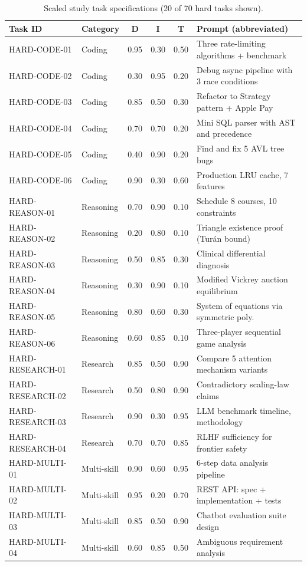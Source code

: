 \begin{table}[h]
\centering
\caption{Scaled study task specifications (20 of 70 hard tasks shown).}
\label{tab:scaled_tasks}
\scriptsize
\begin{tabular}{llcccl}
\toprule
\textbf{Task ID} & \textbf{Category} & \textbf{D} & \textbf{I} & \textbf{T} & \textbf{Prompt (abbreviated)} \\
\midrule
HARD-CODE-01 & Coding & 0.95 & 0.30 & 0.50 & Three rate-limiting algorithms + benchmark \\
HARD-CODE-02 & Coding & 0.30 & 0.95 & 0.20 & Debug async pipeline with 3 race conditions \\
HARD-CODE-03 & Coding & 0.85 & 0.50 & 0.30 & Refactor to Strategy pattern + Apple Pay \\
HARD-CODE-04 & Coding & 0.70 & 0.70 & 0.20 & Mini SQL parser with AST and precedence \\
HARD-CODE-05 & Coding & 0.40 & 0.90 & 0.20 & Find and fix 5 AVL tree bugs \\
HARD-CODE-06 & Coding & 0.90 & 0.30 & 0.60 & Production LRU cache, 7 features \\
HARD-REASON-01 & Reasoning & 0.70 & 0.90 & 0.10 & Schedule 8 courses, 10 constraints \\
HARD-REASON-02 & Reasoning & 0.20 & 0.80 & 0.10 & Triangle existence proof (Tur\'{a}n bound) \\
HARD-REASON-03 & Reasoning & 0.50 & 0.85 & 0.30 & Clinical differential diagnosis \\
HARD-REASON-04 & Reasoning & 0.30 & 0.90 & 0.10 & Modified Vickrey auction equilibrium \\
HARD-REASON-05 & Reasoning & 0.80 & 0.60 & 0.30 & System of equations via symmetric poly. \\
HARD-REASON-06 & Reasoning & 0.60 & 0.85 & 0.10 & Three-player sequential game analysis \\
HARD-RESEARCH-01 & Research & 0.85 & 0.50 & 0.90 & Compare 5 attention mechanism variants \\
HARD-RESEARCH-02 & Research & 0.50 & 0.80 & 0.90 & Contradictory scaling-law claims \\
HARD-RESEARCH-03 & Research & 0.90 & 0.30 & 0.95 & LLM benchmark timeline, methodology \\
HARD-RESEARCH-04 & Research & 0.70 & 0.70 & 0.85 & RLHF sufficiency for frontier safety \\
HARD-MULTI-01 & Multi-skill & 0.90 & 0.60 & 0.95 & 6-step data analysis pipeline \\
HARD-MULTI-02 & Multi-skill & 0.95 & 0.20 & 0.70 & REST API: spec + implementation + tests \\
HARD-MULTI-03 & Multi-skill & 0.85 & 0.50 & 0.90 & Chatbot evaluation suite design \\
HARD-MULTI-04 & Multi-skill & 0.60 & 0.85 & 0.50 & Ambiguous requirement analysis \\
\bottomrule
\end{tabular}
\end{table}


